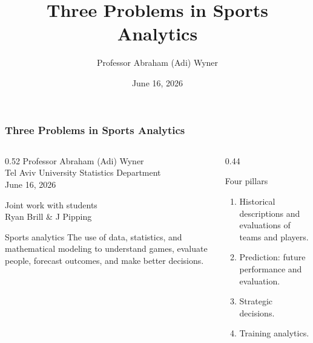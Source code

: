 \documentclass[aspectratio=169,professionalfonts]{beamer}
\title{Three Problems in Sports Analytics}
\author{Professor Abraham (Adi) Wyner  }
\institute{Tel Aviv University Statistics Department}
\date{June 16, 2026}
\begin{document}
\begin{frame}
\frametitle{Three Problems in Sports Analytics}
\begin{columns}[T,totalwidth=\textwidth]
\begin{column}{0.52\textwidth}
  {\Large Professor Abraham (Adi) Wyner}\\[1mm]
  Tel Aviv University Statistics Department\\
  June 16, 2026
  \vspace{2mm}
  
  {\small Joint work with students\\[0.5mm]
  Ryan Brill \& J Pipping}


  \vspace{4mm}
  \begin{block}{Sports analytics}
  The use of data, statistics, and mathematical modeling to understand games, evaluate people, forecast outcomes, and make better decisions.
  \end{block}
\end{column}
\begin{column}{0.44\textwidth}
  \begin{block}{Four pillars}
  \begin{enumerate}
    \item Historical descriptions and evaluations of teams and players.
    \item Prediction: future performance and evaluation.
    \item Strategic decisions.
    \item Training analytics.
  \end{enumerate}
  \end{block}
\end{column}
\end{columns}
\end{frame}
\end{document}
